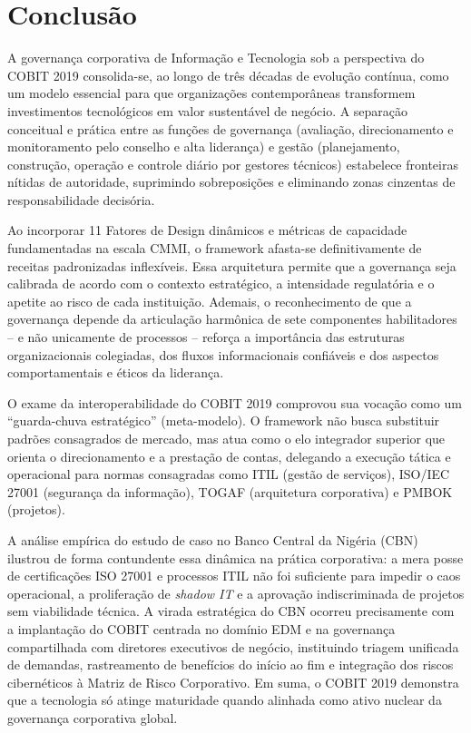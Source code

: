 \section{Conclusão}

A governança corporativa de Informação e Tecnologia sob a perspectiva do COBIT 2019 consolida-se, ao longo de três décadas de evolução contínua, como um modelo essencial para que organizações contemporâneas transformem investimentos tecnológicos em valor sustentável de negócio. A separação conceitual e prática entre as funções de governança (avaliação, direcionamento e monitoramento pelo conselho e alta liderança) e gestão (planejamento, construção, operação e controle diário por gestores técnicos) estabelece fronteiras nítidas de autoridade, suprimindo sobreposições e eliminando zonas cinzentas de responsabilidade decisória.

Ao incorporar 11 Fatores de Design dinâmicos e métricas de capacidade fundamentadas na escala CMMI, o framework afasta-se definitivamente de receitas padronizadas inflexíveis. Essa arquitetura permite que a governança seja calibrada de acordo com o contexto estratégico, a intensidade regulatória e o apetite ao risco de cada instituição. Ademais, o reconhecimento de que a governança depende da articulação harmônica de sete componentes habilitadores -- e não unicamente de processos -- reforça a importância das estruturas organizacionais colegiadas, dos fluxos informacionais confiáveis e dos aspectos comportamentais e éticos da liderança.

O exame da interoperabilidade do COBIT 2019 comprovou sua vocação como um ``guarda-chuva estratégico'' (meta-modelo). O framework não busca substituir padrões consagrados de mercado, mas atua como o elo integrador superior que orienta o direcionamento e a prestação de contas, delegando a execução tática e operacional para normas consagradas como ITIL (gestão de serviços), ISO/IEC 27001 (segurança da informação), TOGAF (arquitetura corporativa) e PMBOK (projetos).

A análise empírica do estudo de caso no Banco Central da Nigéria (CBN) ilustrou de forma contundente essa dinâmica na prática corporativa: a mera posse de certificações ISO 27001 e processos ITIL não foi suficiente para impedir o caos operacional, a proliferação de \textit{shadow IT} e a aprovação indiscriminada de projetos sem viabilidade técnica. A virada estratégica do CBN ocorreu precisamente com a implantação do COBIT centrada no domínio EDM e na governança compartilhada com diretores executivos de negócio, instituindo triagem unificada de demandas, rastreamento de benefícios do início ao fim e integração dos riscos cibernéticos à Matriz de Risco Corporativo. Em suma, o COBIT 2019 demonstra que a tecnologia só atinge maturidade quando alinhada como ativo nuclear da governança corporativa global.
